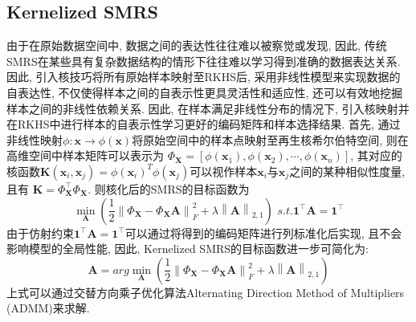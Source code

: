\documentclass[lang=cn,10pt]{gorgeousnbook}
\numberwithin{equation}{section}%
\numberwithin{figure}{section}%
\begin{document}
 \subsection{Kernelized SMRS}
由于在原始数据空间中, 数据之间的表达性往往难以被察觉或发现, 因此, 传统SMRS在某些具有复杂数据结构的情形下往往难以学习得到准确的数据表达关系. 因此, 引入核技巧将所有原始样本映射至RKHS后, 采用非线性模型来实现数据的自表达性, 不仅使得样本之间的自表示性更具灵活性和适应性, 还可以有效地挖掘样本之间的非线性依赖关系.  因此, 在样本满足非线性分布的情况下, 引入核映射并在RKHS中进行样本的自表示性学习更好的编码矩阵和样本选择结果. 首先, 通过非线性映射$\phi : \bm{x}\rightarrow \phi(\bm{x})$将原始空间中的样本点映射至再生核希尔伯特空间, 则在高维空间中样本矩阵可以表示为 $\varPhi _{\boldsymbol{X}}=\left[ \phi \left( \boldsymbol{x}_1 \right) ,\phi \left( \boldsymbol{x}_2 \right) ,\cdots ,\phi \left( \boldsymbol{x}_n \right) \right] $, 其对应的核函数$\bm{K} (\boldsymbol{x}_i,\boldsymbol{x}_j)=\phi (\boldsymbol{x}_i)^T\phi (\boldsymbol{x}_j)$可以视作样本$\boldsymbol{x}_i$与$\boldsymbol{x}_j$之间的某种相似性度量, 且有 $\bm{K}=\boldsymbol{\varPhi }_{\boldsymbol{X}}^{\top}\boldsymbol{\varPhi }_{\boldsymbol{X}}$. 
则核化后的SMRS的目标函数为
\begin{equation}
\min_{\boldsymbol{A}} \left( \frac{1}{2}\left\| \varPhi _{\boldsymbol{X}}-\varPhi _{\boldsymbol{X}}\boldsymbol{A} \right\| _{F}^{2}+\lambda \left\| \boldsymbol{A} \right\| _{2,1} \right) \,\,s.t. \mathbf{1}^{\top}\boldsymbol{A}=\mathbf{1}^{\top}
\end{equation}
由于仿射约束$\mathbf{1}^{\top}\boldsymbol{A}=\mathbf{1}^{\top}$可以通过将得到的编码矩阵进行列标准化后实现, 且不会影响模型的全局性能, 因此, Kernelized SMRS的目标函数进一步可简化为:
\begin{equation}
\boldsymbol{A}=arg\min_{\boldsymbol{A}}\left( \frac{1}{2}\left\| \varPhi _{\boldsymbol{X}}-\varPhi _{\boldsymbol{X}}\boldsymbol{A} \right\| _{F}^{2}+\lambda \left\| \boldsymbol{A} \right\| _{2,1} \right)
\end{equation}
上式可以通过交替方向乘子优化算法Alternating Direction Method of Multipliers (ADMM)来求解. 
\end{document}
